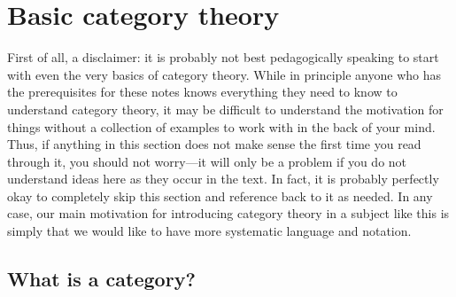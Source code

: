 \cleardoublepage
\chapter{Basic category theory}\label{BasicCategoryTheory}

First of all, a disclaimer:  it is probably not best pedagogically speaking to start with even the very basics of category theory.  While in principle anyone who has the prerequisites for these notes knows everything they need to know to understand category theory, it may be difficult to understand the motivation for things without a collection of examples to work with in the back of your mind.  Thus, if anything in this section does not make sense the first time you read through it, you should not worry---it will only be a problem if you do not understand ideas here as they occur in the text.  In fact, it is probably perfectly okay to completely skip this section and reference back to it as needed.  In any case, our main motivation for introducing category theory in a subject like this is simply that we would like to have more systematic language and notation.

\section{What is a category?}

